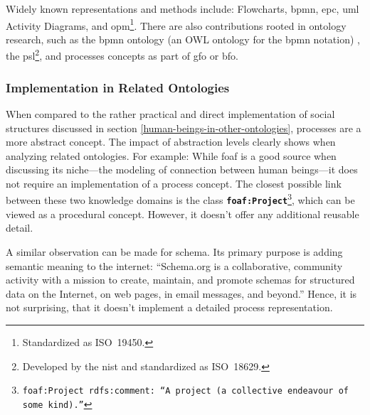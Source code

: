 \documentclass[a4paper, DIV=13, BCOR=0cm]{scrbook}
\newcommand{\class}[1]{\texttt{\textbf{#1}}}
\newcommand{\foottt}[1]{\footnote{\texttt{#1}}}
\begin{document}
Widely known representations and methods include: Flowcharts, \gls{bpmn}, \gls{epc}, \gls{uml} Activity Diagrams, and \gls{opm}\footnote{Standardized as ISO~19450.}. There are also contributions rooted in ontology research, such as the \gls{bpmn} ontology (an OWL ontology for the \gls{bpmn} notation) \cite{2014foisbpmn}, the \gls{psl}\footnote{Developed by the \gls{nist} and standardized as ISO~18629.}, and processes concepts as part of \gls{gfo} or \gls{bfo}.

\subsubsection{Implementation in Related Ontologies }
When compared to the rather practical and direct implementation of social structures discussed in section \ref{human-beings-in-other-ontologies}, processes are a more abstract concept. The impact of abstraction levels clearly shows when analyzing related ontologies. For example: While \gls{foaf} is a good source when discussing its niche---the modeling of connection between human beings---it does not require an implementation of a process concept. The closest possible link between these two knowledge domains is the  class \class{foaf:Project}\foottt{foaf:Project rdfs:comment: \enquote{A project (a collective endeavour of some kind).}}, which can be viewed as a procedural concept. However, it doesn't offer any additional reusable detail.

A similar observation can be made for \gls{schema}. Its primary purpose is adding semantic meaning to the internet: \enquote{Schema.org is a collaborative, community activity with a mission to create, maintain, and promote schemas for structured data on the Internet, on web pages, in email messages, and beyond.} \cite{schema-mission} Hence, it is not surprising, that it doesn't implement a detailed process representation.
\end{document}
